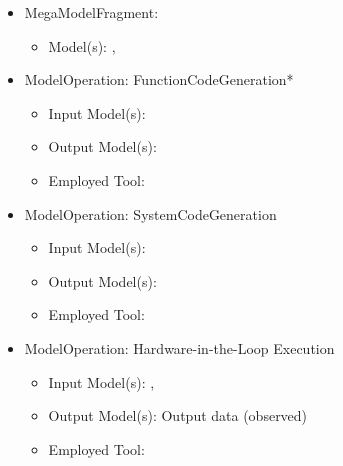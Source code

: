 %

\begin{itemize}
    \item MegaModelFragment: \CPSLabHiLMMF
    \begin{itemize}
        \item Model(s): \CPSLabControlModel*, \CPSLabSystemModel
    \end{itemize}
\end{itemize}


\begin{itemize}
    \item ModelOperation: FunctionCodeGeneration*
    \begin{itemize}
        \item Input Model(s): \CPSLabControlModel
        \item Output Model(s): \CPSLabControlModelCode
        \item Employed Tool: \dSPACETargetLink {}
    \end{itemize}
    \item ModelOperation: SystemCodeGeneration
    \begin{itemize}
        \item Input Model(s): \CPSLabSystemModel
        \item Output Model(s): \CPSLabSystemModelCode
        \item Employed Tool: \dSPACESystemDesk {}
    \end{itemize}
    \item ModelOperation: Hardware-in-the-Loop Execution
    \begin{itemize}
        \item Input Model(s): \CPSLabControlModelCode*, \CPSLabSystemModelCode
        \item Output Model(s): Output data (observed)
        \item Employed Tool: \RobotExecutionLocal {}
    \end{itemize}
\end{itemize}


